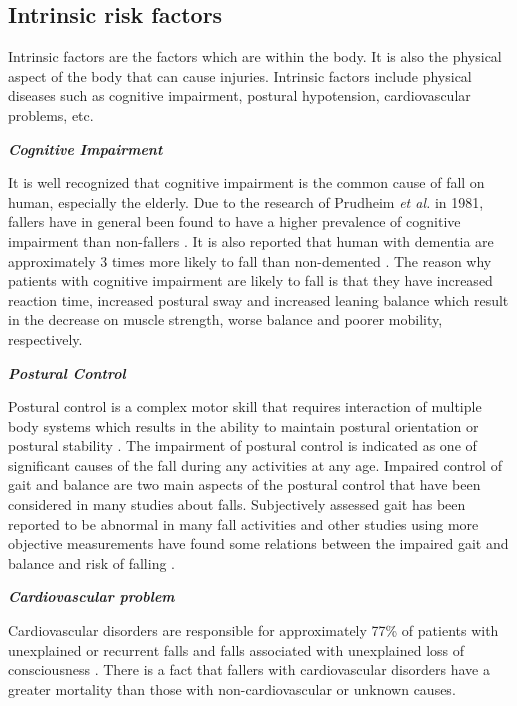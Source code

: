 \documentclass[letterpaper,12pt,titlepage,oneside,final]{book}
\begin{document}
\subsection{Intrinsic risk factors}
Intrinsic factors are the factors which are within the body. It is also the physical aspect of the body that can cause injuries. Intrinsic factors include physical diseases such as cognitive impairment, postural hypotension, cardiovascular problems, etc.\par
\vspace{0.3cm}
\textbf{\textit{Cognitive Impairment}}\par
It is well recognized that cognitive impairment is the common cause of fall on human, especially the elderly. Due to the research of Prudheim \textit{et al.} in 1981, fallers have in general been found to have a higher prevalence of cognitive impairment than non-fallers \cite{cognitive_1}. It is also reported that human with dementia are approximately 3 times more likely to fall than non-demented \cite{cognitive_2}. The reason why patients with cognitive impairment are likely to fall is that they have increased reaction time, increased postural sway and increased leaning balance which result in the decrease on muscle strength, worse balance and poorer mobility, respectively. \par
\vspace{0.3cm}
\textbf{\textit{Postural Control}}\par
Postural control is a complex motor skill that requires interaction of multiple body systems which results in the ability to maintain postural orientation or postural stability \cite{postural_1}\cite{postural_2}. The impairment of postural control is indicated as one of significant causes of the fall during any activities at any age. Impaired control of gait and balance are two main aspects of the postural control that have been considered in many studies about falls. Subjectively assessed gait has been reported to be abnormal in many fall activities and other studies using more objective measurements have found some relations between the impaired gait and balance and risk of falling \cite{bibli_book}.

\vspace{0.3cm}
\textbf{\textit{Cardiovascular problem}}\par
Cardiovascular disorders are responsible for approximately 77\% of patients with unexplained or recurrent falls and falls associated with unexplained loss of consciousness \cite{cardio_1}. There is a fact that fallers with cardiovascular disorders have a greater mortality than those with non-cardiovascular or unknown causes\cite{cardio_2}.   
\end{document}
